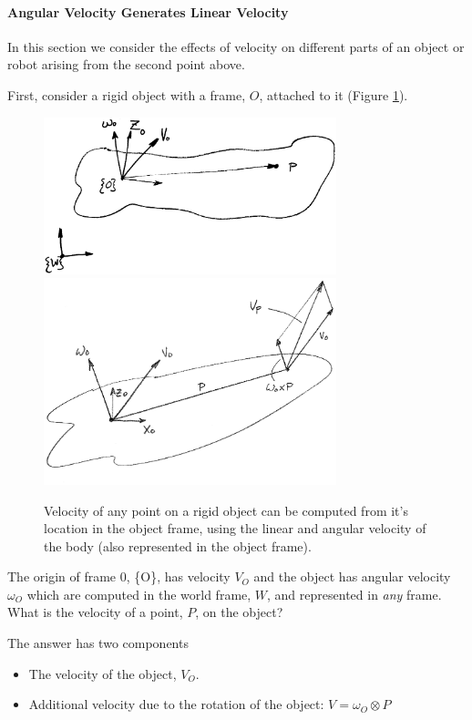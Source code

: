 \paragraph{Angular Velocity Generates Linear Velocity}

In this section we consider the effects of velocity on different parts of
 an object or robot arising from the second point above.

First, consider a rigid object with a frame, $O$, attached to it (Figure \ref{rigidbodyvelocities}).

\begin{figure}\centering
   \includegraphics[width=85mm]{figs05/00064.eps}
   \includegraphics[width=85mm]{figs05/00707.eps}
\caption{Velocity of any point on a rigid object can be computed from it's location in the object frame, using the linear and angular velocity of the body (also represented in the object frame).}\label{rigidbodyvelocities}
\end{figure}

The origin of frame 0, \{O\},  has velocity $V_O$ and the object has angular velocity
$\omega_O$ which are computed in the world frame, $W$, and represented in {\it any}
frame.
What is the velocity of a point, $P$, on the object?

The answer has two components
\begin{itemize}
  \item The velocity of the object, $V_O$.
  \item Additional velocity due to the rotation of the object: $ V = \omega_O\otimes P$
\end{itemize}

